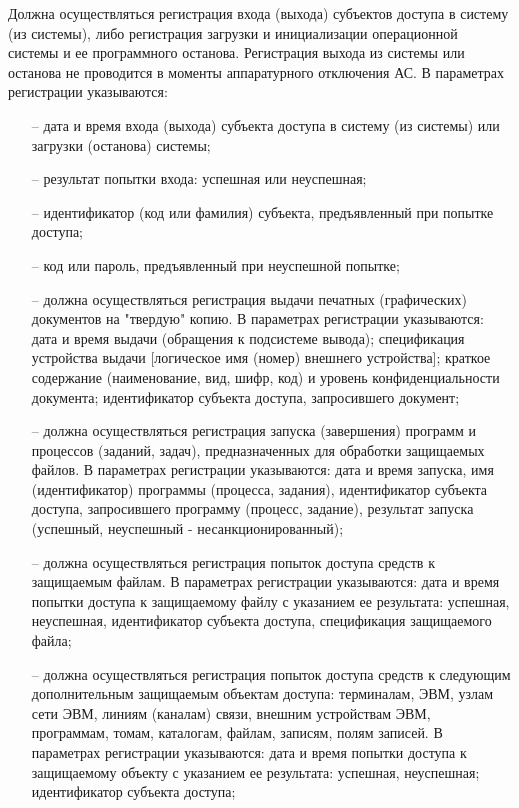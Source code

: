 Должна осуществляться регистрация входа (выхода) субъектов доступа в
систему (из системы), либо регистрация загрузки и инициализации
операционной системы и ее программного останова. Регистрация выхода из
системы или останова не проводится в моменты аппаратурного отключения
АС. В параметрах регистрации указываются:
\begin{itemize}
  \item[--] дата и время входа (выхода) субъекта доступа в систему (из системы) или
  загрузки (останова) системы;
  \item[--] результат попытки входа: успешная или неуспешная;
  \item[--] идентификатор (код или фамилия) субъекта, предъявленный при попытке
  доступа;
  \item[--] код или пароль, предъявленный при неуспешной попытке;
  \item[--] должна осуществляться регистрация выдачи печатных (графических) 
  документов на "твердую" копию. В параметрах регистрации указываются:
  дата и время выдачи (обращения к подсистеме вывода);
  спецификация устройства выдачи [логическое имя (номер) внешнего устройства]; 
  краткое содержание (наименование, вид, шифр, код) и уровень конфиденциальности
  документа;
  идентификатор субъекта доступа, запросившего документ;
  \item[--] должна осуществляться регистрация запуска (завершения) программ и процессов
  (заданий, задач), предназначенных для обработки защищаемых файлов. В параметрах 
  регистрации указываются: дата и время запуска, имя (идентификатор) программы (процесса, задания),
  идентификатор субъекта доступа, запросившего программу (процесс, задание), результат запуска (успешный, неуспешный - несанкционированный);
  \item[--] должна осуществляться регистрация попыток доступа средств 
  к защищаемым файлам. В параметрах регистрации указываются: дата и время попытки 
  доступа к защищаемому файлу с указанием ее результата: успешная, неуспешная,
  идентификатор субъекта доступа, спецификация защищаемого файла;
  \item[--] должна осуществляться регистрация попыток доступа средств к следующим 
  дополнительным защищаемым объектам доступа: терминалам, ЭВМ, узлам сети ЭВМ, линиям (каналам) связи, 
  внешним устройствам ЭВМ, программам, томам, каталогам, файлам, записям, полям записей. В параметрах регистрации указываются:
  дата и время попытки доступа к защищаемому объекту с указанием ее результата: успешная, неуспешная;
  идентификатор субъекта доступа;

\end{itemize}
